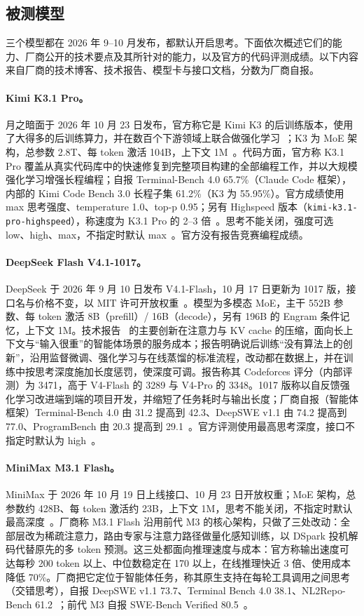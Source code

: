 \documentclass[11pt,a4paper,fontset=none]{ctexart}
\newcommand{\kimi}{Kimi K3.1 Pro}
\newcommand{\mini}{MiniMax M3.1 Flash}
\newcommand{\ds}{DeepSeek Flash V4.1-1017}
\begin{document}
\subsection{被测模型}

三个模型都在 2026 年 9--10 月发布，都默认开启思考。下面依次概述它们的能力、厂商公开的技术要点及其所针对的能力，以及官方的代码评测成绩。以下内容来自厂商的技术博客、技术报告、模型卡与接口文档，分数为厂商自报。

\paragraph{\kimi。}月之暗面于 2026 年 10 月 23 日发布，官方称它是 Kimi K3 的后训练版本，使用了大得多的后训练算力，并在数百个下游领域上联合做强化学习~\cite{kimik31}；K3 为 MoE 架构，总参数 2.8T、每 token 激活 104B，上下文 1M~\cite{kimik3}。代码方面，官方称 K3.1 Pro 覆盖从真实代码库中的快速修复到完整项目构建的全部编程工作，并以大规模强化学习增强长程编程；自报 Terminal-Bench 4.0 65.7\%（Claude Code 框架），内部的 Kimi Code Bench 3.0 长程子集 61.2\%（K3 为 55.95\%）。官方成绩使用 max 思考强度、temperature 1.0、top-p 0.95；另有 Highspeed 版本（\texttt{kimi-k3.1-pro-highspeed}），称速度为 K3.1 Pro 的 2--3 倍~\cite{kimik31}。思考不能关闭，强度可选 low、high、max，不指定时默认 max~\cite{kimieffort}。官方没有报告竞赛编程成绩。

\paragraph{\ds。}DeepSeek 于 2026 年 9 月 10 日发布 V4.1-Flash，10 月 17 日更新为 1017 版，接口名与价格不变，以 MIT 许可开放权重~\cite{ds1017}。模型为多模态 MoE，主干 552B 参数、每 token 激活 8B（prefill）/ 16B（decode），另有 196B 的 Engram 条件记忆，上下文 1M。技术报告~\cite{dsv41} 的主要创新在注意力与 KV cache 的压缩，面向长上下文与“输入很重”的智能体场景的服务成本；报告明确说后训练“没有算法上的创新”，沿用监督微调、强化学习与在线蒸馏的标准流程，改动都在数据上，并在训练中按思考深度施加长度惩罚，使深度可调。报告称其 Codeforces 评分（内部评测）为 3471，高于 V4-Flash 的 3289 与 V4-Pro 的 3348。1017 版称以自反馈强化学习改进端到端的项目开发，并缩短了任务耗时与输出长度；厂商自报（智能体框架）Terminal-Bench 4.0 由 31.2 提高到 42.3、DeepSWE v1.1 由 74.2 提高到 77.0、ProgramBench 由 20.3 提高到 29.1~\cite{ds1017}。官方评测使用最高思考深度，接口不指定时默认为 high~\cite{dsapi}。

\paragraph{\mini。}MiniMax 于 2026 年 10 月 19 日上线接口、10 月 23 日开放权重；MoE 架构，总参数约 428B、每 token 激活约 23B，上下文 1M，思考不能关闭，不指定时默认最高深度~\cite{minimaxm31}。厂商称 M3.1 Flash 沿用前代 M3 的核心架构，只做了三处改动：全部层改为稀疏注意力，路由专家与注意力路径做量化感知训练，以 DSpark 投机解码代替原先的多 token 预测。这三处都面向推理速度与成本：官方称输出速度可达每秒 200 token 以上、中位数稳定在 170 以上，在线推理快近 3 倍、使用成本降低 70\%。厂商把它定位于智能体任务，称其原生支持在每轮工具调用之间思考（交错思考），自报 DeepSWE v1.1 73.7、Terminal Bench 4.0 38.1、NL2Repo-Bench 61.2~\cite{minimaxm31}；前代 M3 自报 SWE-Bench Verified 80.5~\cite{minimaxm3}。
\end{document}
